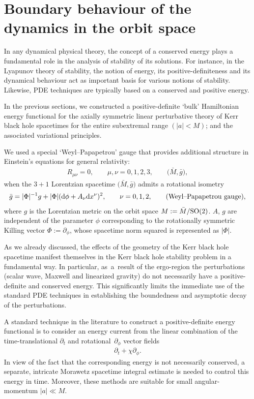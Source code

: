\documentclass[11pt]{article}
\numberwithin{equation}{section}
\def\ptl{\partial}%
\numberwithin{equation}{section}
\begin{document}
\section{Boundary behaviour of the dynamics in the orbit space}\label{section5}

In any dynamical physical theory, the concept of a conserved energy plays a fundamental role in the analysis of stability of its solutions. For instance, in the Lyapunov theory of stability, the notion of energy,
its positive-definiteness and its dynamical behaviour act as important basis for various notions of stability. Likewise, PDE techniques are typically based on a conserved and positive energy.

In the previous sections, we constructed a positive-definite `bulk' Hamiltonian energy functional for the axially symmetric linear perturbative theory of Kerr black hole spacetimes for the entire subextremal range $(\vert a \vert<M)$; and the associated variational principles.

We used a special `Weyl--Papapetrou' gauge that provides additional structure in Einstein's equations for general relativity:
\begin{align*}
R_{\mu \nu} =0, \qquad \mu, \nu=0, 1,2, 3, \qquad \bigl(\bar{M}, \bar{g}\bigr),
\end{align*}
when the $3+1$ Lorentzian spacetime $\bigl(\bar{M}, \bar{g}\bigr)$ admits a rotational isometry
\begin{align} \label{WP-gauge}
\bar{g} = \vert \Phi \vert^{-1} g + \vert \Phi \vert ({\rm d}\phi + A_\nu {\rm d}x^\nu)^2, \qquad \nu = 0,1, 2, \qquad \text{(Weyl--Papapetrou gauge)},
\end{align}
where $g$ is the Lorentzian metric on the orbit space $M := \bar{M}/{\rm SO}(2)$. $A$, $g$ are independent of the parameter $\phi$ corresponding to the rotationally symmetric Killing vector $\Phi :=\ptl_\phi$, whose spacetime norm squared is represented as $\vert \Phi \vert$.

As we already discussed, the effects of the geometry of the Kerr black hole spacetime manifest themselves in the Kerr black hole stability problem in a fundamental way. In particular, as~a~result of the ergo-region the perturbations (scalar wave, Maxwell and linearized gravity) do not necessarily have a positive-definite and conserved energy. This significantly limits the immediate use of the standard PDE techniques in establishing the boundedness and asymptotic decay of the perturbations.

A standard technique in the literature to construct a positive-definite energy functional is to consider an energy current from the linear combination of the time-translational $\ptl_t$ and rotational~$\ptl_\phi$ vector fields
\begin{align*}
\ptl_ t + \chi \ptl_\phi.
\end{align*}
 In view of the fact that the corresponding energy is not necessarily conserved, a separate, intricate Morawetz spacetime integral estimate is needed to control this energy in time. Moreover, these methods are suitable for small angular-momentum $\vert a \vert \ll M$.
\end{document}
